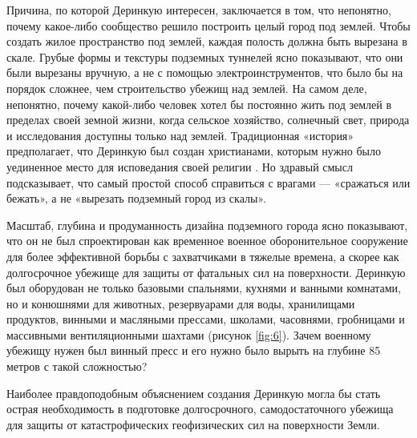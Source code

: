 \documentclass[10pt,twocolumn,letterpaper]{article}
\begin{document}
Причина, по которой Деринкую интересен, заключается в том, что непонятно, почему какое-либо сообщество решило построить целый город под землей. Чтобы создать жилое пространство под землей, каждая полость должна быть вырезана в скале. Грубые формы и текстуры подземных туннелей ясно показывают, что они были вырезаны вручную, а не с помощью электроинструментов, что было бы на порядок сложнее, чем строительство убежищ над землей. На самом деле, непонятно, почему какой-либо человек хотел бы постоянно жить под землей в пределах своей земной жизни, когда сельское хозяйство, солнечный свет, природа и исследования доступны только над землей. Традиционная «история» предполагает, что Деринкую был создан христианами, которым нужно было уединенное место для исповедания своей религии \cite{53}. Но здравый смысл подсказывает, что самый простой способ справиться с врагами — «сражаться или бежать», а не «вырезать подземный город из скалы».

Масштаб, глубина и продуманность дизайна подземного города ясно показывают, что он не был спроектирован как временное военное оборонительное сооружение для более эффективной борьбы с захватчиками в тяжелые времена, а скорее как долгосрочное убежище для защиты от фатальных сил на поверхности. Деринкую был оборудован не только базовыми спальнями, кухнями и ванными комнатами, но и конюшнями для животных, резервуарами для воды, хранилищами продуктов, винными и масляными прессами, школами, часовнями, гробницами и массивными вентиляционными шахтами (рисунок \ref{fig:6}). Зачем военному убежищу нужен был винный пресс и его нужно было вырыть на глубине 85 метров с такой сложностью?

Наиболее правдоподобным объяснением создания Деринкую могла бы стать острая необходимость в подготовке долгосрочного, самодостаточного убежища для защиты от катастрофических геофизических сил на поверхности Земли.



\end{document}
